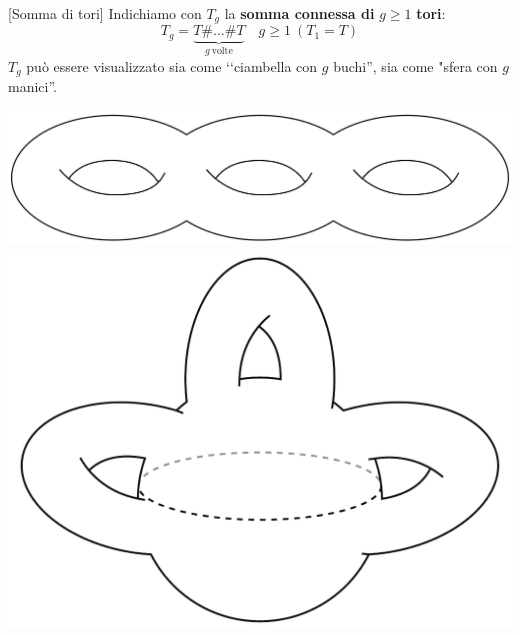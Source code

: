 \begin{definition}{}[Somma di tori]
	Indichiamo con $T_g$ la \textbf{somma connessa di }$g\geq 1$ \textbf{tori}:
	\begin{equation*}
		T_g=\underbrace{T\# \ldots\# T}_{g\ \text{volte}}\quad g\geq 1\ \left(T_1=T\right)
	\end{equation*}
$T_g$ può essere visualizzato sia come ‘‘ciambella con $g$ buchi'', sia come "sfera con $g$ manici''.
\begin{center}
	\includegraphics[trim=0cm 0cm 0cm 0cm, clip, scale=0.23]{images/toruschain.pdf}
	\includegraphics[trim=0cm 0cm 0cm 0cm, clip, scale=0.23]{images/spherewithhandle.pdf}
\end{center}
\end{definition}

